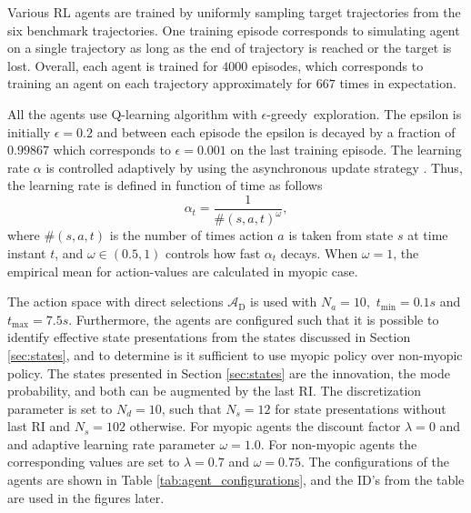 \documentclass[english, 12pt, a4paper, elec, utf8, a-1b, online]{aaltothesis}
\newcommand{\As}{\mathcal{A}}
\newcommand{\egreedy}{$\epsilon$-greedy~}
\newcommand{\tmax}{t_\text{max}}
\newcommand{\tmin}{t_\text{min}}
\newcommand{\Asdir}{\As_\text{D}}
\begin{document}
Various RL agents are trained by uniformly sampling target trajectories from the six benchmark trajectories.
One training episode corresponds to simulating agent on a single trajectory as long as the end of trajectory is reached or the target is lost.
Overall, each agent is trained for $4000$ episodes, which corresponds to training an agent on each trajectory approximately for $667$ times in expectation.

All the agents use Q-learning algorithm with \egreedy exploration.
The epsilon is initially $\epsilon=0.2$ and between each episode the epsilon is decayed by a fraction of $0.99867$ which corresponds to $\epsilon=0.001$ on the last training episode.
The learning rate $\alpha$ is controlled adaptively by using the asynchronous update strategy \cite{Even-Dar2003}.
Thus, the learning rate is defined in function of time as follows
\begin{equation}
    \alpha_t = \frac{1}{\#(s, a, t)^\omega},
\end{equation}
where $\#(s, a, t)$ is the number of times action $a$ is taken from state $s$ at time instant $t$, and $\omega \in (0.5, 1)$ controls how fast $\alpha_t$ decays.
When $\omega=1$, the empirical mean for action-values are calculated in myopic case.

The action space with direct selections $\Asdir$ is used with $N_a=10,$ $\tmin=0.1s$ and $\tmax=7.5s$.
Furthermore, the agents are configured such that it is possible to identify effective state presentations from the states discussed in Section \ref{sec:states}, and to determine is it sufficient to use myopic policy over non-myopic policy.
The states presented in Section \ref{sec:states} are the innovation, the mode probability, and both can be augmented by the last RI.
The discretization parameter is set to $N_d=10$, such that $N_s=12$ for state presentations without last RI and $N_s=102$ otherwise.
For myopic agents the discount factor $\lambda=0$ and and adaptive learning rate parameter $\omega=1.0$.
For non-myopic agents the corresponding values are set to $\lambda=0.7$ and $\omega=0.75$. 
The configurations of the agents are shown in Table \ref{tab:agent_configurations}, and the ID's from the table are used in the figures later.
\end{document}
